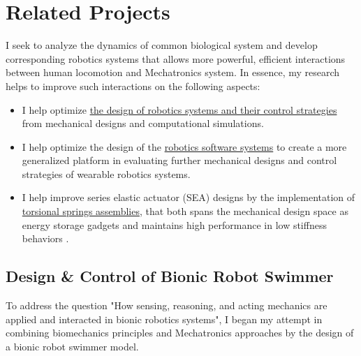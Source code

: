 \documentclass[8pt]{article}
\begin{document}

 

% 

\section{Related Projects}

I seek to analyze the dynamics of common biological system and develop corresponding robotics systems that allows more powerful, efficient interactions between human locomotion and Mechatronics system. In essence, my research helps to improve such interactions on the following aspects: 

\begin{itemize}

    \item {I help optimize \hyperref[sec:RobotSwimmer]{the design of robotics systems and their control strategies} from mechanical designs and computational simulations.}

    \item {I help optimize the design of the \hyperref[sec:OSL-Library]{robotics software systems} to create a more generalized platform in evaluating further mechanical designs and control strategies of wearable robotics systems.}

    \item {I help improve series elastic actuator (SEA) designs by the implementation of \hyperref[sec:series-spring]{torsional springs assemblies}, that both spans the mechanical design space as energy storage gadgets and maintains high performance in low stiffness behaviors \cite{SpringDesign_OSL}.}
    
    
    

\end{itemize}


    \subsection{Design \& Control of Bionic Robot Swimmer}  \label{sec:RobotSwimmer}
    
    To address the question "How sensing, reasoning, and acting mechanics are applied and interacted in bionic robotics systems", I began my attempt in combining biomechanics principles and Mechatronics approaches by the design of a bionic robot swimmer model.
\end{document}
